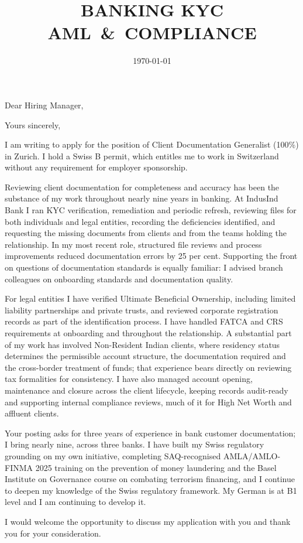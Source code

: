 \documentclass[11pt,a4paper,sans]{moderncv}
\title{BANKING \textbar{} KYC \textbar{} \mbox{AML \& COMPLIANCE}}
\begin{document}
\date{\today}
\opening{Dear Hiring Manager,}
\closing{Yours sincerely,}

\makelettertitle

I am writing to apply for the position of Client Documentation Generalist
(100\%) in Zurich. I hold a Swiss B permit, which entitles me to work in
Switzerland without any requirement for employer sponsorship.

Reviewing client documentation for completeness and accuracy has been the
substance of my work throughout nearly nine years in banking. At IndusInd Bank
I ran KYC verification, remediation and periodic refresh, reviewing files for
both individuals and legal entities, recording the deficiencies identified, and
requesting the missing documents from clients and from the teams holding the
relationship. In my most recent role, structured file reviews and process
improvements reduced documentation errors by 25 per cent. Supporting the front
on questions of documentation standards is equally familiar: I advised branch
colleagues on onboarding standards and documentation quality.

For legal entities I have verified Ultimate Beneficial Ownership, including
limited liability partnerships and private trusts, and reviewed corporate
registration records as part of the identification process. I have handled
FATCA and CRS requirements at onboarding and throughout the relationship. A
substantial part of my work has involved Non-Resident Indian clients, where
residency status determines the permissible account structure, the
documentation required and the cross-border treatment of funds; that experience
bears directly on reviewing tax formalities for consistency. I have also
managed account opening, maintenance and closure across the client lifecycle,
keeping records audit-ready and supporting internal compliance reviews, much of
it for High Net Worth and affluent clients.

Your posting asks for three years of experience in bank customer
documentation; I bring nearly nine, across three banks. I have built my Swiss
regulatory grounding on my own initiative, completing SAQ-recognised
AMLA/AMLO-FINMA 2025 training on the prevention of money laundering and the
Basel Institute on Governance course on combating terrorism financing, and I
continue to deepen my knowledge of the Swiss regulatory framework. My German is
at B1 level and I am continuing to develop it.

I would welcome the opportunity to discuss my application with you and thank
you for your consideration.

\makeletterclosing
\end{document}
